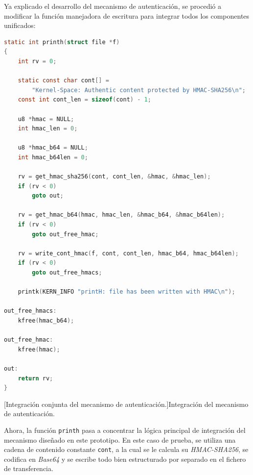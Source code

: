Ya explicado el desarrollo del mecanismo de autenticación, se procedió a modificar la función manejadora de escritura para integrar todos los componentes unificados:\\

\begin{lstlisting}[language=C]
static int printh(struct file *f)
{
	int rv = 0;

	static const char cont[] =
		"Kernel-Space: Authentic content protected by HMAC-SHA256\n";
	const int cont_len = sizeof(cont) - 1;

	u8 *hmac = NULL;
	int hmac_len = 0;

	u8 *hmac_b64 = NULL;
	int hmac_b64len = 0;

	rv = get_hmac_sha256(cont, cont_len, &hmac, &hmac_len);
	if (rv < 0)
		goto out;

	rv = get_hmac_b64(hmac, hmac_len, &hmac_b64, &hmac_b64len);
	if (rv < 0)
		goto out_free_hmac;

	rv = write_cont_hmac(f, cont, cont_len, hmac_b64, hmac_b64len);
	if (rv < 0)
		goto out_free_hmacs;

	printk(KERN_INFO "printH: file has been written with HMAC\n");

out_free_hmacs:
	kfree(hmac_b64);

out_free_hmac:
	kfree(hmac);

out:
	return rv;
}
\end{lstlisting}
\captionsetup{type=code,justification=centering,singlelinecheck=false}
[Integración conjunta del mecanismo de autenticación.]{Integración del mecanismo de autenticación.}
\label{cod:crypto_printh}
\vspace{\baselineskip}

Ahora, la función \verb|printh| pasa a concentrar la lógica principal de integración del mecanismo diseñado en este prototipo.
En este caso de prueba, se utiliza una cadena de contenido constante \verb|cont|, a la cual se le calcula su \textit{HMAC-SHA256}, se codifica en \textit{Base64} y se escribe todo bien estructurado por separado en el fichero de transferencia.\\

\

